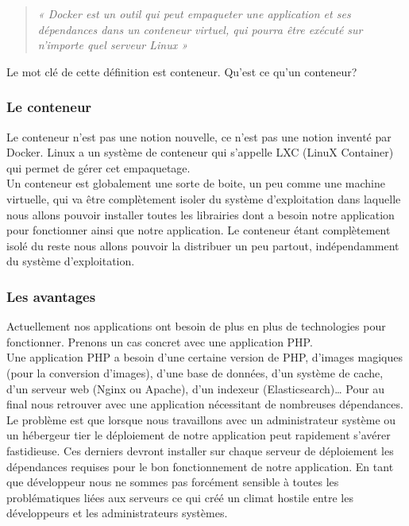 \documentclass{report}
\begin{document}
      \begin{quotation}
        \emph{« Docker est un outil qui peut empaqueter une application et ses dépendances dans un conteneur virtuel, qui pourra être exécuté sur n’importe quel serveur Linux »}\\
      \end{quotation}

      Le mot clé de cette définition est conteneur. Qu’est ce qu’un conteneur?

        \subsubsection{Le conteneur}
        Le conteneur n’est pas une notion nouvelle, ce n’est pas une notion inventé par Docker. Linux a un système de conteneur qui s’appelle LXC (LinuX Container) qui permet de gérer cet empaquetage.\\

        Un conteneur est globalement une sorte de boite, un peu comme une machine virtuelle, qui va être complètement isoler du système d’exploitation dans laquelle nous allons pouvoir installer toutes les librairies dont a besoin notre application pour fonctionner ainsi que notre application. Le conteneur étant complètement isolé du reste nous allons pouvoir la distribuer un peu partout, indépendamment du système d’exploitation.

        \subsubsection{Les avantages}
        Actuellement nos applications ont besoin de plus en plus de technologies pour fonctionner. Prenons un cas concret avec une application PHP.\\

        Une application PHP a besoin d’une certaine version de PHP, d’images magiques (pour la conversion d’images), d’une base de données, d’un système de cache, d’un serveur web (Nginx ou Apache), d’un indexeur (Elasticsearch)… Pour au final nous retrouver avec une application nécessitant de nombreuses dépendances.\\

        Le problème est que lorsque nous travaillons avec un administrateur système ou un hébergeur tier le déploiement de notre application peut rapidement s’avérer fastidieuse. Ces derniers devront installer sur chaque serveur de déploiement les dépendances requises pour le bon fonctionnement de notre application. En tant que développeur nous ne sommes pas forcément sensible à toutes les problématiques liées aux serveurs ce qui créé un climat hostile entre les développeurs et les administrateurs systèmes.\\
\end{document}

